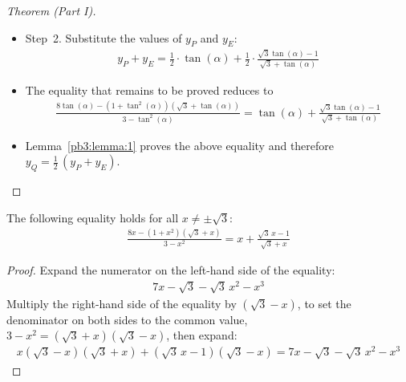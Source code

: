 \begin{proof}[Theorem (Part I)]
\begin{itemize}
\item Step~2. Substitute the values of $y_{P}$ and $y_{E}$:
\begin{align*}
y_{P} + y_{E}
= \frac{1}{2} \cdot \tan(\alpha) + \frac{1}{2} \cdot \frac{\sqrt{3}\tan(\alpha)-1}{\sqrt{3}+\tan(\alpha)}
\end{align*}
\item The equality that remains to be proved reduces to
\begin{align*}
\frac{8\tan(\alpha)-(1+\tan^{2}(\alpha))(\sqrt{3}+\tan(\alpha))}{3 - \tan^{2}(\alpha)}
= \tan(\alpha) + \frac{\sqrt{3}\tan(\alpha)-1}{\sqrt{3}+\tan(\alpha)}
\end{align*}
\item Lemma~\ref{pb3:lemma:1} proves the above equality and therefore $y_{Q}=\frac{1}{2} \, (y_{P} + y_{E})$.
\end{itemize}
\end{proof}

\setcounter{lemma}{0}
\begin{lemma}\label{pb3:lemma:1}
The following equality holds for all $x\ne\pm\sqrt{3}$:
\begin{align*}
\frac{8x-(1+x^{2})(\sqrt{3}+x)}{3-x^{2}} 
= x + \frac{\sqrt{3}\,x-1}{\sqrt{3}+x}
\end{align*}
\end{lemma}
\begin{proof}
Expand the numerator on the left-hand side of the equality:
\begin{align*}
7x-\sqrt{3}-\sqrt{3}\,x^{2}-x^{3}
\end{align*}
Multiply the right-hand side of the equality by $(\sqrt{3}-x)$, to set the denominator on both sides to the common value, $3-x^{2}=(\sqrt{3}+x)(\sqrt{3}-x)$, then expand:
\begin{align*}
x(\sqrt{3}-x)(\sqrt{3}+x)+(\sqrt{3}\,x-1)(\sqrt{3}-x)
= 7x-\sqrt{3}-\sqrt{3}\,x^{2}-x^{3}
\end{align*}
\end{proof}


